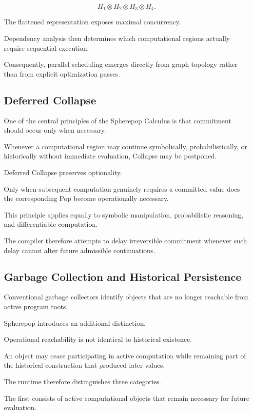 \documentclass[12pt,oneside]{article}
\theoremstyle{definition}
\theoremstyle{remark}
\begin{document}
\[
H_1\otimes H_2\otimes H_3\otimes H_4.
\]

The flattened representation exposes maximal concurrency.

Dependency analysis then determines which computational regions actually
require sequential execution.

Consequently, parallel scheduling emerges directly from graph topology rather
than from explicit optimization passes.

\subsection{Deferred Collapse}

One of the central principles of the Spherepop Calculus is that commitment
should occur only when necessary.

Whenever a computational region may continue symbolically, probabilistically,
or historically without immediate evaluation, Collapse may be postponed.

Deferred Collapse preserves optionality.

Only when subsequent computation genuinely requires a committed value does the
corresponding Pop become operationally necessary.

This principle applies equally to symbolic manipulation, probabilistic
reasoning, and differentiable computation.

The compiler therefore attempts to delay irreversible commitment whenever such
delay cannot alter future admissible continuations.

\subsection{Garbage Collection and Historical Persistence}

Conventional garbage collectors identify objects that are no longer reachable
from active program roots.

Spherepop introduces an additional distinction.

Operational reachability is not identical to historical existence.

An object may cease participating in active computation while remaining part
of the historical construction that produced later values.

The runtime therefore distinguishes three categories.

The first consists of active computational objects that remain necessary for
future evaluation.
\end{document}
